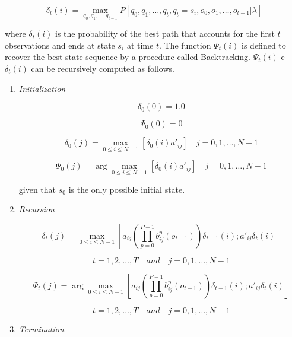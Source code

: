 \documentclass{article}[14pt, oneside, a4paper, times]
\begin{document}
\begin{equation}
\delta_t(i) = \max_{q_0, q_1, \ldots, q_{t-1}}
    P[q_0, q_1, \ldots, q_t, q_t = s_i, o_0, o_1, \ldots, o_{t-1} | \lambda]
    \label{EQ:delta}
\end{equation}

\noindent where $\delta_t(i)$ is the probability of the best path that accounts
for the first $t$ observations and ends at state $s_i$ at time $t$. The
function $\Psi_t(i)$ is defined to recover the best state sequence by a
procedure called Backtracking. $\Psi_t(i)$ e $\delta_t(i)$ can be recursively
computed as follows.

\begin{enumerate}
\item \textit{Initialization}

\begin{equation}
    \delta_0(0) = 1.0
    \label{EQ:delta-initialization}
\end{equation}

$$\Psi_0(0) = 0$$

$$\delta_0(j) = \max_{0 \leq i \leq N-1} [ \delta_0(i) a'_{ij} ] \quad j = 0, 1, \dots, N-1$$

$$\Psi_0(j) = \arg \max_{0 \leq i \leq N-1} [ \delta_0(i) a'_{ij} ] \quad j = 0, 1, \dots, N-1$$

\noindent given that $s_0$ is the only possible initial state.


\item \textit{Recursion}

\begin{equation}
    \delta_t(j) = \max_{0 \leq i \leq N-1} \left[ a_{ij} \left( \prod_{p=0}^{P-1} b_{ij}^p(o_{t-1}) \right)
                        \delta_{t-1}(i); a'_{ij} \delta_t(i) \right]
    \label{EQ:delta-recursion}
\end{equation}

$$t = 1, 2, \ldots, T \quad and \quad j = 0, 1, \ldots, N-1$$

\begin{equation}
    \Psi_t(j) = \arg \max_{0 \leq i \leq N-1} \left[ a_{ij} \left( \prod_{p=0}^{P-1} b_{ij}^p(o_{t-1}) \right)
                        \delta_{t-1}(i); a'_{ij} \delta_t(i) \right]
    \label{EQ:psi-recursion}
\end{equation}

$$t = 1, 2, \ldots, T \quad and \quad j = 0, 1, \ldots, N-1$$


\item \textit{Termination}


\end{enumerate}
\end{document}
